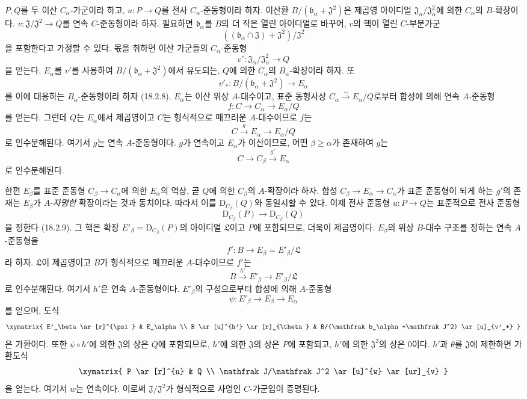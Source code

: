 \begin{env}[19.5.6.1]
\label{0.19.5.6.1-fr}
$P,Q$를 두 이산 $C_\alpha$-가군이라 하고,
$u:P\to Q$를 전사 $C_\alpha$-준동형이라 하자. 이산환
$B/(\mathfrak b_\alpha+\mathfrak J^2)$은 제곱영 아이디얼
$\mathfrak J_\alpha/\mathfrak J_\alpha^2$에 의한 $C_\alpha$의
$B$-확장이다. $v:\mathfrak J/\mathfrak J^2\to Q$를 연속
$C$-준동형이라 하자. 필요하면 $\mathfrak b_\alpha$를 $B$의 더 작은
열린 아이디얼로 바꾸어, $v$의 핵이 열린 $C$-부분가군
\[
  ((\mathfrak b_\alpha\cap\mathfrak J)+\mathfrak J^2)/
  \mathfrak J^2
\]
을 포함한다고 가정할 수 있다. 몫을 취하면 이산 가군들의
$C_\alpha$-준동형
\[
  v':\mathfrak J_\alpha/\mathfrak J_\alpha^2\longrightarrow Q
\]
을 얻는다. $E_\alpha$를 $v'$를 사용하여
$B/(\mathfrak b_\alpha+\mathfrak J^2)$에서 유도되는, $Q$에 의한
$C_\alpha$의 $B_\alpha$-확장이라 하자. 또
\[
  v'_*:B/(\mathfrak b_\alpha+\mathfrak J^2)\longrightarrow E_\alpha
\]
를 이에 대응하는 $B_\alpha$-준동형이라 하자 (18.2.8).
$E_\alpha$는 이산 위상 $A$-대수이고, 표준 동형사상
$C_\alpha\xrightarrow{\sim}E_\alpha/Q$로부터 합성에 의해 연속
$A$-준동형
\[
  f:C\longrightarrow C_\alpha\longrightarrow E_\alpha/Q
\]
를 얻는다. 그런데 $Q$는 $E_\alpha$에서 제곱영이고 $C$는 형식적으로
매끄러운 $A$-대수이므로 $f$는
\[
  C\xrightarrow{g}E_\alpha\longrightarrow E_\alpha/Q
\]
로 인수분해된다. 여기서 $g$는 연속 $A$-준동형이다. $g$가 연속이고
$E_\alpha$가 이산이므로, 어떤 $\beta\geq\alpha$가 존재하여 $g$는
\[
  C\longrightarrow C_\beta\xrightarrow{g'}E_\alpha
\]
로 인수분해된다.

한편 $E_\beta$를 표준 준동형 $C_\beta\to C_\alpha$에 의한
$E_\alpha$의 역상, 곧 $Q$에 의한 $C_\beta$의 $A$-확장이라 하자.
합성 $C_\beta\to E_\alpha\to C_\alpha$가 표준 준동형이 되게 하는
$g'$의 존재는 $E_\beta$가 $A$-\emph{자명한} 확장이라는 것과
동치이다. 따라서 이를 $\mathrm D_{C_\beta}(Q)$와 동일시할 수 있다.
이제 전사 준동형 $u:P\to Q$는 표준적으로 전사 준동형
\[
  \mathrm D_{C_\beta}(P)\longrightarrow
  \mathrm D_{C_\beta}(Q)
\]
을 정한다 (18.2.9). 그 핵은 확장
$E'_\beta=\mathrm D_{C_\beta}(P)$의 아이디얼 $\mathfrak L$이고
$P$에 포함되므로, 더욱이 제곱영이다. $E_\beta$의 위상
$B$-대수 구조를 정하는 연속 $A$-준동형을
\[
  f':B\longrightarrow E_\beta=E'_\beta/\mathfrak L
\]
라 하자. $\mathfrak L$이 제곱영이고 $B$가 형식적으로 매끄러운
$A$-대수이므로 $f'$는
\[
  B\xrightarrow{h'}E'_\beta\longrightarrow E'_\beta/\mathfrak L
\]
로 인수분해된다. 여기서 $h'$은 연속 $A$-준동형이다.
$E'_\beta$의 구성으로부터 합성에 의해 $A$-준동형
\[
  \psi:E'_\beta\longrightarrow E_\beta\longrightarrow E_\alpha
\]
를 얻으며, 도식
\[
  \xymatrix{
    E'_\beta \ar[r]^{\psi} & E_\alpha \\
    B \ar[u]^{h'} \ar[r]_{\theta} &
    B/(\mathfrak b_\alpha+\mathfrak J^2) \ar[u]_{v'_*}
  }
\]
은 가환이다. 또한 $\psi\circ h'$에 의한 $\mathfrak J$의 상은
$Q$에 포함되므로, $h'$에 의한 $\mathfrak J$의 상은 $P$에
포함되고, $h'$에 의한 $\mathfrak J^2$의 상은 0이다. $h'$과
$\theta$를 $\mathfrak J$에 제한하면 가환도식
\[
  \xymatrix{
    P \ar[r]^{u} & Q \\
    \mathfrak J/\mathfrak J^2 \ar[u]^{w} \ar[ur]_{v}
  }
\]
을 얻는다. 여기서 $w$는 연속이다. 이로써
$\mathfrak J/\mathfrak J^2$가 형식적으로 사영인 $C$-가군임이
증명된다.
\end{env}

